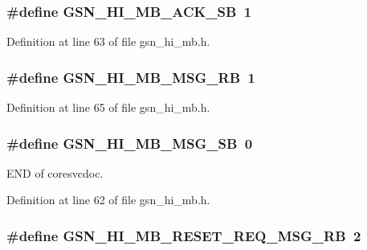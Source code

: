 \hypertarget{a00506_a8d3b3866f9d09968c947cef8e2e7c61b}{
\subsubsection[{GSN\_\-HI\_\-MB\_\-ACK\_\-SB}]{\setlength{\rightskip}{0pt plus 5cm}\#define GSN\_\-HI\_\-MB\_\-ACK\_\-SB~1}}
\label{a00506_a8d3b3866f9d09968c947cef8e2e7c61b}


Definition at line 63 of file gsn\_\-hi\_\-mb.h.

\hypertarget{a00506_ac9fe421d7ea35b912a309a151189e8f4}{
\subsubsection[{GSN\_\-HI\_\-MB\_\-MSG\_\-RB}]{\setlength{\rightskip}{0pt plus 5cm}\#define GSN\_\-HI\_\-MB\_\-MSG\_\-RB~1}}
\label{a00506_ac9fe421d7ea35b912a309a151189e8f4}


Definition at line 65 of file gsn\_\-hi\_\-mb.h.

\hypertarget{a00506_a24c17224665b2175de44eef6666d844a}{
\subsubsection[{GSN\_\-HI\_\-MB\_\-MSG\_\-SB}]{\setlength{\rightskip}{0pt plus 5cm}\#define GSN\_\-HI\_\-MB\_\-MSG\_\-SB~0}}
\label{a00506_a24c17224665b2175de44eef6666d844a}
END of coresvcdoc. 

Definition at line 62 of file gsn\_\-hi\_\-mb.h.

\hypertarget{a00506_a82316e9aa8750e0f14322eac4e824279}{
\subsubsection[{GSN\_\-HI\_\-MB\_\-RESET\_\-REQ\_\-MSG\_\-RB}]{\setlength{\rightskip}{0pt plus 5cm}\#define GSN\_\-HI\_\-MB\_\-RESET\_\-REQ\_\-MSG\_\-RB~2}}
\label{a00506_a82316e9aa8750e0f14322eac4e824279}


